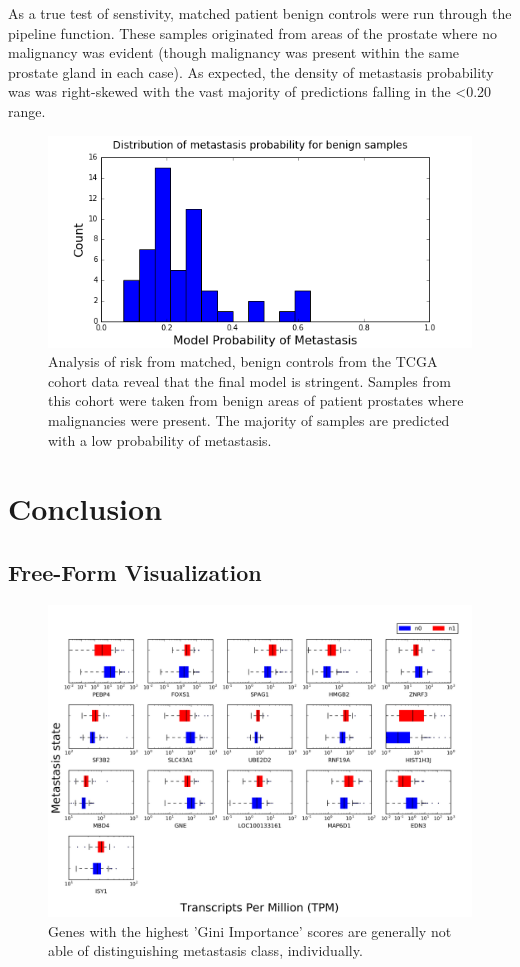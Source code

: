 \documentclass[final]{article}
\begin{document}
As a true test of senstivity, matched patient benign controls were run through the
pipeline function.  These samples originated from areas of the prostate where
no malignancy was evident (though malignancy was present within the same prostate
gland in each case).  As expected, the density of metastasis probability was was
right-skewed with the vast majority of predictions falling in the <0.20 range.

\begin{figure} [h!]
  \centering
  \includegraphics[scale = 0.5]{Sensitivity}
  \caption{\label{fig:Sensitivity} Analysis of risk from matched, benign controls from the TCGA cohort data reveal that the final model is stringent.  Samples from this cohort were taken from benign areas of patient prostates where malignancies were present.  The majority of samples are predicted with a low probability of metastasis.}
\end{figure}

\section{Conclusion}

\subsection{Free-Form Visualization}

\begin{figure}[h!]
  \centering
  \includegraphics[width=\textwidth]{boxplots}
  \caption{\label{fig:separate}Genes with the highest 'Gini Importance' scores are generally not able of distinguishing metastasis class, individually.}
\end{figure}
\end{document}
